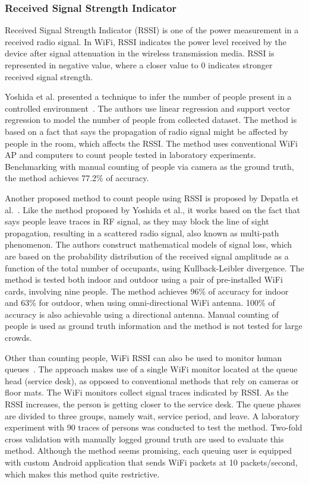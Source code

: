 	\subsubsection{Received Signal Strength Indicator} %
	\label{ssub:rssi}
	Received Signal Strength Indicator (\ac{RSSI}) is one of the power measurement in a received radio signal. In WiFi, \ac{RSSI} indicates the power level received by the device after signal attenuation in the wireless transmission media. \ac{RSSI} is represented in negative value, where a closer value to 0 indicates stronger received signal strength.

	Yoshida et al. presented a technique to infer the number of people present in a controlled environment~\cite{thesis052}. The authors use linear regression and support vector regression to model the number of people from collected dataset. The method is based on a fact that says the propagation of radio signal might be affected by people in the room, which affects the \ac{RSSI}. The method uses conventional WiFi \ac{AP} and computers to count people tested in laboratory experiments. Benchmarking with manual counting of people via camera as the ground truth, the method achieves 77.2\% of accuracy.

	Another proposed method to count people using \ac{RSSI} is proposed by Depatla et al.~\cite{thesis046}. Like the method proposed by Yoshida et al., it works based on the fact that says people leave traces in \ac{RF} signal, as they may block the line of sight propagation, resulting in a scattered radio signal, also known as multi-path phenomenon. The authors construct mathematical models of signal loss, which are based on the probability distribution of the received signal amplitude as a function of the total number of occupants, using Kullback-Leibler divergence. The method is tested both indoor and outdoor using a pair of pre-installed WiFi cards, involving nine people. The method achieves 96\% of accuracy for indoor and 63\% for outdoor, when using omni-directional WiFi antenna. 100\% of accuracy is also achievable using a directional antenna. Manual counting of people is used as ground truth information and the method is not tested for large crowds.

	Other than counting people, WiFi \ac{RSSI} can also be used to monitor human queues~\cite{thesis012}. The approach makes use of a single WiFi monitor located at the queue head (service desk), as opposed to conventional methods that rely on cameras or floor mats. The WiFi monitors collect signal traces indicated by \ac{RSSI}. As the \ac{RSSI} increases, the person is getting closer to the service desk. The queue phases are divided to three groups, namely wait, service period, and leave. A laboratory experiment with 90 traces of persons was conducted to test the method. Two-fold cross validation with manually logged ground truth are used to evaluate this method. Although the method seems promising, each queuing user is equipped with custom Android application that sends WiFi packets at 10 packets/second, which makes this method quite restrictive.

